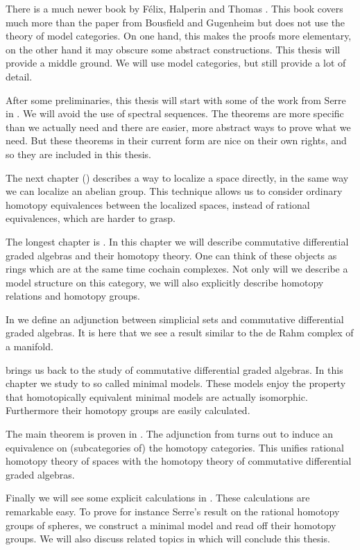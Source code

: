 There is a much newer book by Félix, Halperin and Thomas \cite{felix}. This book covers much more than the paper from Bousfield and Gugenheim but does not use the theory of model categories. On one hand, this makes the proofs more elementary, on the other hand it may obscure some abstract constructions. This thesis will provide a middle ground. We will use model categories, but still provide a lot of detail.

After some preliminaries, this thesis will start with some of the work from Serre in . We will avoid the use of spectral sequences. The theorems are more specific than we actually need and there are easier, more abstract ways to prove what we need. But these theorems in their current form are nice on their own rights, and so they are included in this thesis.

The next chapter () describes a way to localize a space directly, in the same way we can localize an abelian group. This technique allows us to consider ordinary homotopy equivalences between the localized spaces, instead of rational equivalences, which are harder to grasp.

The longest chapter is . In this chapter we will describe commutative differential graded algebras and their homotopy theory. One can think of these objects as rings which are at the same time cochain complexes. Not only will we describe a model structure on this category, we will also explicitly describe homotopy relations and homotopy groups.

In  we define an adjunction between simplicial sets and commutative differential graded algebras. It is here that we see a result similar to the de Rahm complex of a manifold.

 brings us back to the study of commutative differential graded algebras. In this chapter we study to so called minimal models. These models enjoy the property that homotopically equivalent minimal models are actually isomorphic. Furthermore their homotopy groups are easily calculated.

The main theorem is proven in . The adjunction from  turns out to induce an equivalence on (subcategories of) the homotopy categories. This unifies rational homotopy theory of spaces with the homotopy theory of commutative differential graded algebras.

Finally we will see some explicit calculations in . These calculations are remarkable easy. To prove for instance Serre's result on the rational homotopy groups of spheres, we construct a minimal model and read off their homotopy groups. We will also discuss related topics in  which will conclude this thesis.

